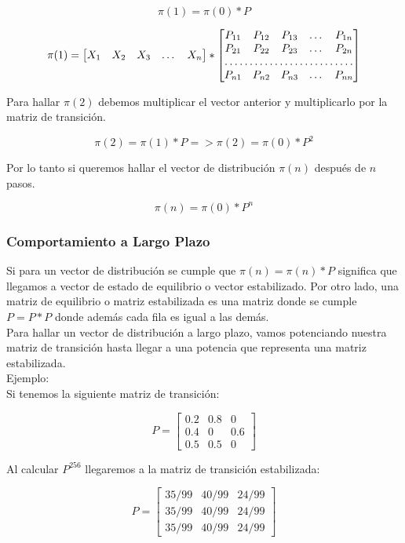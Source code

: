 \documentclass{article}
\begin{document}
$$
\pi(1) = \pi(0) * P
$$

$$
\pi(1) = 
\begin{bmatrix}
    X_{1} & X_{2} & X_{3} & \dots & X_{n}
\end{bmatrix}
*
\begin{bmatrix}
    P_{11}       & P_{12} & P_{13} & \dots & P_{1n} \\
    P_{21}       & P_{22} & P_{23} & \dots & P_{2n} \\
    \hdotsfor{5} \\
    P_{n1}       & P_{n2} & P_{n3} & \dots & P_{nn}
\end{bmatrix}
$$

Para hallar $\pi(2)$ debemos multiplicar el vector anterior y multiplicarlo por la matriz de transición.

$$
\pi(2) = \pi(1) * P => \pi(2) = \pi(0) * P^2
$$

Por lo tanto si queremos hallar el vector de distribución $\pi(n)$ después de $n$ pasos.

$$
\pi(n) = \pi(0) * P^n
$$

\subsubsection{Comportamiento a Largo Plazo}
Si para un vector de distribución se cumple que $\pi(n)=\pi(n)*P$ significa que llegamos a vector de estado de equilibrio o vector estabilizado. Por otro lado, una matriz de equilibrio o matriz estabilizada es una matriz donde se cumple $P = P*P$ donde además cada fila es igual a las demás.\\
Para hallar un vector de distribución a largo plazo, vamos potenciando nuestra matriz de transición hasta llegar a una potencia que representa una matriz estabilizada. \\

Ejemplo:\\

Si tenemos la siguiente matriz de transición: 

$$
P = 
\begin{bmatrix}
    0.2       & 0.8 & 0 \\
    0.4       & 0 & 0.6 \\
    0.5       & 0.5 & 0 
\end{bmatrix}
$$

Al calcular $P^{256}$ llegaremos a la matriz de transición estabilizada:

$$
P = 
\begin{bmatrix}
    35/99       & 40/99 & 24/99 \\
    35/99       & 40/99 & 24/99 \\
    35/99       & 40/99 & 24/99 
\end{bmatrix}
$$
\end{document}
